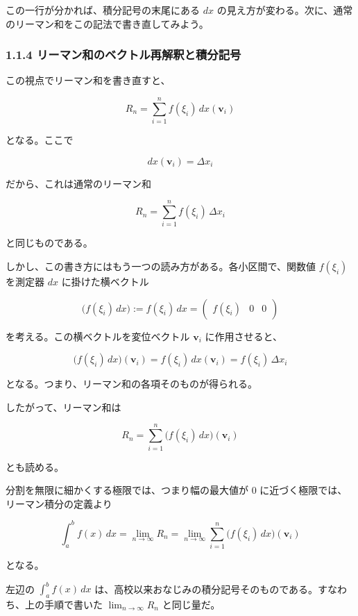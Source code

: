 \documentclass[a4paper,12pt,openany]{book}
\begin{document}
この一行が分かれば、積分記号の末尾にある \(dx\)
の見え方が変わる。次に、通常のリーマン和をこの記法で書き直してみよう。

\hypertarget{ux30eaux30fcux30deux30f3ux548cux306eux30d9ux30afux30c8ux30ebux518dux89e3ux91c8ux3068ux7a4dux5206ux8a18ux53f7}{%
\subsubsection{1.1.4
リーマン和のベクトル再解釈と積分記号}\label{ux30eaux30fcux30deux30f3ux548cux306eux30d9ux30afux30c8ux30ebux518dux89e3ux91c8ux3068ux7a4dux5206ux8a18ux53f7}}

この視点でリーマン和を書き直すと、

\[
R_n
=
\sum_{i=1}^n f(\xi_i)\,dx(\mathbf{v}_i)
\]

となる。ここで

\[
dx(\mathbf{v}_i)=\Delta x_i
\]

だから、これは通常のリーマン和

\[
R_n
=
\sum_{i=1}^n f(\xi_i)\,\Delta x_i
\]

と同じものである。

しかし、この書き方にはもう一つの読み方がある。各小区間で、関数値
\(f(\xi_i)\) を測定器 \(dx\) に掛けた横ベクトル

\[
\bigl(f(\xi_i)\,dx\bigr)
:=
f(\xi_i)\,dx
=
\begin{pmatrix}
f(\xi_i) & 0 & 0
\end{pmatrix}
\]

を考える。この横ベクトルを変位ベクトル \(\mathbf{v}_i\) に作用させると、

\[
\bigl(f(\xi_i)\,dx\bigr)(\mathbf{v}_i)
=
f(\xi_i)\,dx(\mathbf{v}_i)
=
f(\xi_i)\,\Delta x_i
\]

となる。つまり、リーマン和の各項そのものが得られる。

したがって、リーマン和は

\[
R_n
=
\sum_{i=1}^n
\bigl(f(\xi_i)\,dx\bigr)(\mathbf{v}_i)
\]

とも読める。

分割を無限に細かくする極限では、つまり幅の最大値が \(0\)
に近づく極限では、リーマン積分の定義より

\[
\int_a^b f(x)\,dx
=
\lim_{n\to\infty} R_n
=
\lim_{n\to\infty}
\sum_{i=1}^n
\bigl(f(\xi_i)\,dx\bigr)(\mathbf{v}_i)
\]

となる。

左辺の \(\int_a^b f(x)\,dx\)
は、高校以来おなじみの積分記号そのものである。すなわち、上の手順で書いた
\(\lim_{n\to\infty}R_n\) と同じ量だ。
\end{document}
